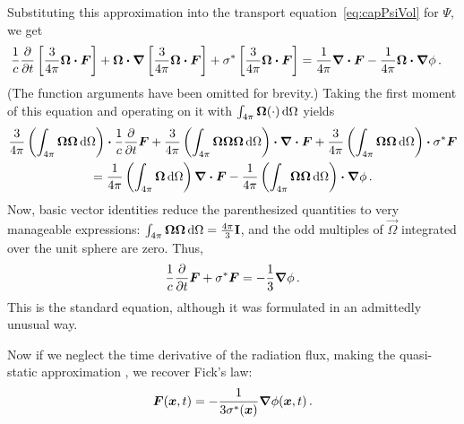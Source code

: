 Substituting this approximation into the transport equation~\eqref{eq:capPsiVol}
for $\Psi$, we get
\begin{align*}
  \frac{1}{c} \frac{\partial }{\partial t} \left[ \frac{3}{4\pi} \bm{\Omega} \bm{\cdot} \bm{F} \right]
  + \bm{\Omega}\bm{\cdot} \bm{\nabla} \left[ \frac{3}{4\pi} \bm{\Omega} \bm{\cdot} \bm{F} \right]
  + \sigma^\ast \left[ \frac{3}{4\pi} \bm{\Omega} \bm{\cdot} \bm{F} \right]
  &= \frac{1}{4\pi} \bm{\nabla} \bm{\cdot}\bm{F}
  - \frac{1}{4\pi} \bm{\Omega}\bm{\cdot} \bm{\nabla} \phi\,.
\end{align*}
(The function arguments have been omitted for brevity.)
Taking the first moment of this equation and operating on it with $\int_{4\pi}
\bm{\Omega}(\cdot) \mathop{}\!\mathrm{d}\Omega$ yields
\begin{multline*}
\frac{3}{4\pi} \left( \int_{4\pi} \bm{\Omega}\bm{\Omega}\mathop{}\!\mathrm{d}\Omega \right) \bm{\cdot}
\frac{1}{c} \frac{\partial }{\partial t} \bm{F}
+ \frac{3}{4\pi} \left( \int_{4\pi}
  \bm{\Omega}\bm{\Omega}\bm{\Omega}\mathop{}\!\mathrm{d}\Omega \right)
\bm{\cdot} \bm{\nabla} \bm{\cdot} \bm{F}
+ \frac{3}{4\pi} \left( \int_{4\pi} \bm{\Omega}\bm{\Omega}\mathop{}\!\mathrm{d}\Omega \right)
\bm{\cdot} \sigma^\ast \bm{F}
\\
= \frac{1}{4\pi} \left( \int_{4\pi} \bm{\Omega}\mathop{}\!\mathrm{d}\Omega \right)
\bm{\nabla} \bm{\cdot}\bm{F}
- \frac{1}{4\pi} \left( \int_{4\pi} \bm{\Omega}\bm{\Omega}\mathop{}\!\mathrm{d}\Omega \right)
\bm{\cdot} \bm{\nabla} \phi\,.
\end{multline*}
Now, basic vector identities \cite{Lar2007} reduce the parenthesized
quantities to very manageable expressions: $\int_{4\pi}
\bm{\Omega}\bm{\Omega}\mathop{}\!\mathrm{d}\Omega=\frac{4\pi}{3}\mathbf{I}$, and the odd
multiples of $\vec{\Omega}$ integrated over the unit sphere are zero. Thus,
\begin{equation*}
  \frac{1}{c} \frac{\partial }{\partial t} \bm{F}
  + \sigma^\ast \bm{F}
  =
  - \frac{1}{3} \bm{\nabla} \phi\,.
\end{equation*}
This is the standard \Pone{} equation, although it was formulated in an
admittedly unusual way.

Now if we neglect the time derivative of the radiation flux, making the
quasi-static approximation
\cite{Dud1976}, we recover Fick's law:
\begin{equation*}
\bm{F}(\bm{x}, t) = -\frac{1}{3\sigma^\ast(\bm{x})} \bm{\nabla}\phi(\bm{x}, t) \,.
\end{equation*}

